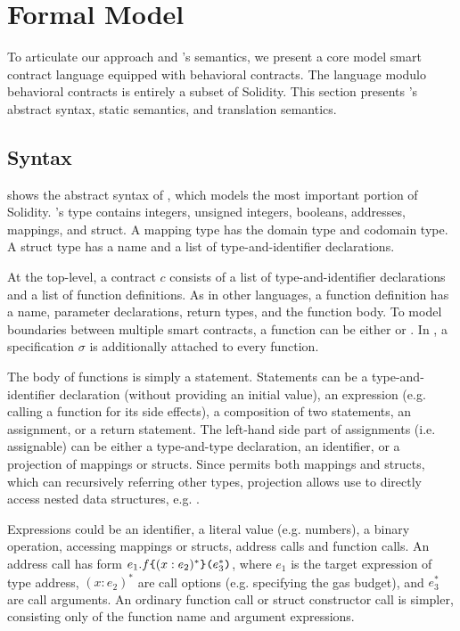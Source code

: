 \section{Formal Model} \label{sec:model}

To articulate our approach and \lang's semantics, we present a core model
smart contract language \corelang equipped with
behavioral contracts. The language modulo behavioral
contracts is entirely a subset of Solidity.
This section presents \corelang's abstract syntax, static semantics, and
translation semantics.



\subsection{Syntax}

 shows the abstract syntax of \corelang,
which models the most important portion of Solidity.
\corelang's type contains integers, unsigned integers, booleans,
addresses, mappings, and struct.
A mapping type has the domain type and codomain type.
A struct type has a name and a list of type-and-identifier declarations.

At the top-level, a contract $c$ consists of a list of type-and-identifier
declarations and a list of function definitions.  As in other languages, a
function definition has a name, parameter declarations, return types, and the
function body.  To model boundaries between multiple smart contracts, a
function can be either  or .
In \corelang, a specification $\sigma$ is additionally attached to every function.

The body of functions is simply a statement.
Statements can be a type-and-identifier declaration (without providing an initial
value), an expression (e.g. calling a function for its side effects), a
composition of two statements, an assignment, or a return statement.
The left-hand side part of assignments (i.e. assignable) can be either
a type-and-type declaration, an identifier, or a projection of mappings or structs.
Since \corelang permits both mappings and structs, which can recursively referring
other types, projection allows use to directly access nested data structures,
e.g. .

Expressions could be an identifier, a literal value (e.g. numbers), a binary
operation, accessing mappings or structs, address calls and function calls.
An address call has form $e_1.f\texttt{\{}(x: e_2)^*\texttt{\}(}e_3^*\texttt{)}$,
where $e_1$ is the target expression of type address,
$(x: e_2)^*$ are call options (e.g. specifying the gas budget),
and $e_3^*$ are call arguments.
An ordinary function call or struct constructor call is simpler, consisting
only of the function name and argument expressions.

